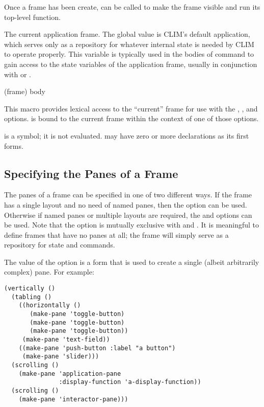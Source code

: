 Once a frame has been create,  can be called to make the
frame visible and run its top-level function.


The current application frame.  The global value is CLIM's default application,
which serves only as a repository for whatever internal state is needed by CLIM
to operate properly.  This variable is typically used in the bodies of command
to gain access to the state variables of the application frame, usually in
conjunction with  or .

 {(frame) \body body}

This macro provides lexical access to the ``current'' frame for use with the
, , and  options.   is bound to the
current frame within the context of one of those options.  

 is a symbol; it is not evaluated.   may have zero or more
declarations as its first forms.


\subsection {Specifying the Panes of a Frame\label{frame-panes}}

The panes of a frame can be specified in one of two different ways.  If the
frame has a single layout and no need of named panes, then the  option
can be used.  Otherwise if named panes or multiple layouts are required, the
 and  options can be used.  Note that the 
option is mutually exclusive with  and .   It is
meaningful to define frames that have no panes at all; the frame will simply
serve as a repository for state and commands.

The value of the  option is a form that is used to create a single
(albeit arbitrarily complex) pane.  For example:

\begin{verbatim}
(vertically ()
  (tabling ()
    ((horizontally ()
       (make-pane 'toggle-button)
       (make-pane 'toggle-button)
       (make-pane 'toggle-button))
     (make-pane 'text-field))
    ((make-pane 'push-button :label "a button")
     (make-pane 'slider)))
  (scrolling ()
    (make-pane 'application-pane
               :display-function 'a-display-function))
  (scrolling ()
    (make-pane 'interactor-pane)))
\end{verbatim}

